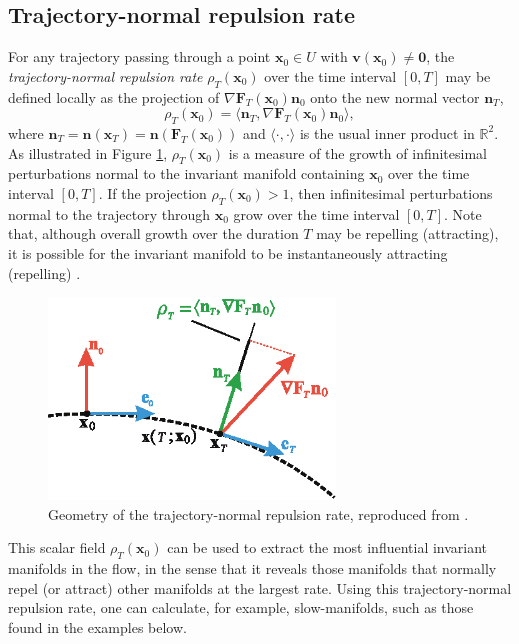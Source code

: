 \documentclass[twocolumn]{svjour3}
\begin{document}
\subsection{Trajectory-normal repulsion rate}
For any trajectory passing through a point $\mathbf{x}_0 \in U$ with 
$\mathbf{v}(\mathbf{x}_0) \ne \mathbf{0}$, the {\it trajectory-normal repulsion rate} $\rho_T(\mathbf{x}_0)$ \cite{haller_variational_2011} over the time interval $[0, T]$ may be defined locally as the projection of $\nabla\mathbf{F}_T (\mathbf{x}_0) \mathbf{n}_0 $ onto the new normal vector
$\mathbf{n}_T$,
\begin{equation}
\rho_T(\mathbf{x}_0) = \langle  \mathbf{n}_T , \nabla \mathbf{F}_T (\mathbf{x}_0) \mathbf{n}_0 \rangle,
\label{eq:reprate}
\end{equation}
where $\mathbf{n}_T = \mathbf{n}(\mathbf{x}_T) = \mathbf{n}(\mathbf{F}_T (\mathbf{x}_0))$ and $\langle\cdot,\cdot\rangle$ is the usual inner product in $\mathbb{R}^2$. 
As illustrated in Figure \ref{fig:normal-repulsion-factor-2D}, $\rho_T(\mathbf{x}_0)$ is a measure of the growth of infinitesimal perturbations normal to the invariant manifold containing $\mathbf{x}_0$ over the time interval $[0,T]$.
If the projection $\rho_T(\mathbf{x}_0) >1$, then infinitesimal perturbations normal to the trajectory through $\mathbf{x}_0$ grow over the time interval $[0,T]$. Note that, although overall growth over the duration $T$ may be repelling (attracting), it is possible for the invariant manifold to be instantaneously attracting (repelling) \cite{tallapragada2017globally}.
\begin{figure}
\centering
\includegraphics[width=3in]{Figures/normal-repulsion-factor-2D.eps}
\caption{Geometry of the trajectory-normal repulsion rate, reproduced from \cite{nave2018global}.}
\label{fig:normal-repulsion-factor-2D}
\end{figure}

This scalar field $\rho_T(\mathbf{x}_0)$ can be used to extract the most influential invariant manifolds in the flow, in the sense that it reveals those manifolds that normally repel (or attract) other manifolds at the largest rate. Using this trajectory-normal repulsion rate, one can calculate, for example, slow-manifolds, such as those found in the examples below.
\end{document}
